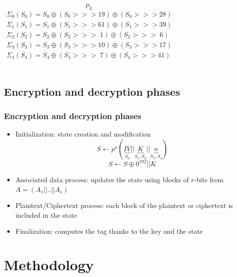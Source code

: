 \documentclass{beamer}
\begin{document}
\begin{frame}
\begin{columns}[T]
			$$p_L$$
			\tiny
			\begin{gather*}
				\Sigma_0(S_0) = S_0 \oplus (S_0 >>> 19) \oplus (S_0 >>> 28)\\
				\Sigma_1(S_1) = S_1 \oplus (S_1 >>> 61) \oplus (S_1 >>> 39)\\
				\Sigma_2(S_2) = S_2 \oplus (S_2 >>> \;  1) \oplus (S_2 >>> \; 6)\\
				\Sigma_3(S_3) = S_3 \oplus (S_3 >>> 10) \oplus (S_3 >>> 17)\\
				\Sigma_4(S_4) = S_4 \oplus (S_4 >>> \; 7) \oplus (S_4 >>> 41)\\
			\end{gather*}
		\end{columns}
	\end{frame}
	
	\subsection{Encryption and decryption phases}
	\begin{frame}
		\frametitle{Encryption and decryption phases}	
		\begin{itemize}
			\item Initialization: state creation and modification
			$$S \leftarrow p^{a}( \underbrace{IV}_{S_0}||\underbrace{K}_{S_1,S_2}||\underbrace{n}_{S_3,S_4})$$
			$$S \leftarrow S \oplus 0^{192} || K$$
			\item Associated data process: updates the state using blocks of $r$-bits from $A=(A_1||..||A_s)$
			\item Plaintext/Ciphertext process: each block of the plaintext or ciphertext is included in the state
			\item Finalization: computes the tag thanks to the key and the state
		\end{itemize}	
	\end{frame}
	
	
	\section{Methodology}
\end{document}
